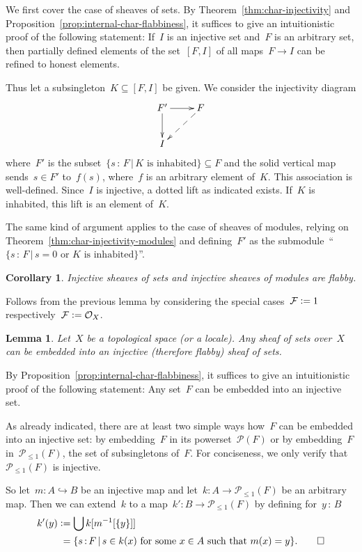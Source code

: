 \documentclass[10pt,reqno,a4paper]{amsbook}
\makeatletter
\theoremstyle{definition}
\theoremstyle{plain}
\newtheorem{cor}[defn]{Corollary}
\newtheorem{lemma}[defn]{Lemma}
\theoremstyle{remark}
\newcommand{\F}{\mathcal{F}}
\renewcommand{\O}{\mathcal{O}}
\renewcommand{\P}{\mathcal{P}}
\newcommand{\?}{\,{:}\,}
\renewcommand{\_}{\mathpunct{.}\,}
\newcommand{\defeq}{\vcentcolon=}
\renewenvironment{proof}[1][\proofname]{\par
  \pushQED{\qed}%
  \normalfont \topsep6\p@\@plus6\p@\relax
  \trivlist
  \item[\hskip\labelsep
        \itshape
    #1\@addpunct{.}]\ignorespaces
}{%
  \popQED\endtrivlist\@endpefalse
}
\makeatother
\begin{document}
\begin{proof}
We first cover the case of sheaves of sets. By Theorem~\ref{thm:char-injectivity}
and Proposition~\ref{prop:internal-char-flabbiness}, it suffices to give an
intuitionistic proof of the following statement: If~$I$ is an injective set
and~$F$ is an arbitrary set, then partially defined elements of the set~$[F,I]$
of all maps~$F \to I$ can be refined to honest elements.

Thus let a subsingleton~$K \subseteq [F,I]$ be given. We consider the
injectivity diagram
\[ \xymatrix{
  F' \ar[r]\ar[d] & F \ar@{-->}[ld] \\
  I
} \]
where~$F'$ is the subset~$\{ s \? F \,|\, \text{$K$ is inhabited} \} \subseteq F$ and the
solid vertical map sends~$s \in F'$ to~$f(s)$, where~$f$ is an arbitrary element
of~$K$. This association is well-defined. Since~$I$ is injective, a dotted lift
as indicated exists. If~$K$ is inhabited, this lift is an element of~$K$.

The same kind of argument applies to the case of sheaves of modules, relying on
Theorem~\ref{thm:char-injectivity-modules} and defining~$F'$ as the
submodule~``$\{ s \? F \,|\, \text{$s = 0$ or $K$ is inhabited} \}$''.
\end{proof}

\begin{cor}Injective sheaves of sets and injective sheaves of modules are
flabby.\end{cor}

\begin{proof}Follows from the previous lemma by considering the special cases~$\F
\defeq 1$ respectively~$\F \defeq \O_X$.\end{proof}

\begin{lemma}\label{lemma:enough-flabby}
Let~$X$ be a topological space (or a locale). Any sheaf of sets
over~$X$ can be embedded into an injective (therefore flabby) sheaf of sets.
\end{lemma}

\begin{proof}By Proposition~\ref{prop:internal-char-flabbiness}, it suffices to
give an intuitionistic proof of the following statement: Any set~$F$ can be
embedded into an injective set.

As already indicated, there are at least two simple ways how~$F$ can be embedded
into an injective set: by embedding~$F$ in its powerset~$\P(F)$ or by
embedding~$F$ in~$\P_{\leq1}(F)$, the set of subsingletons of~$F$. For
conciseness, we only verify that~$\P_{\leq1}(F)$ is injective.

So let~$m : A \hookrightarrow B$ be an injective map and let~$k : A \to
\P_{\leq1}(F)$ be an arbitrary map. Then we can extend~$k$ to a map~$k' : B \to
\P_{\leq1}(F)$ by defining for~$y \? B$
\begin{align*}
  k'(y) &\defeq \bigcup k[m^{-1}[\{y\}]] \\
  &\phantom{\vcentcolon}= \{ s\?F \,|\, \text{$s \in k(x)$ for some~$x \in A$ such that~$m(x) = y$} \}.
  \qedhere
\end{align*}
\end{proof}
\end{document}

